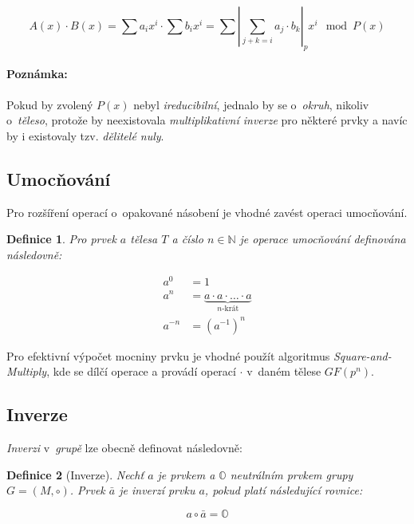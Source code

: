 \documentclass[thesis=M,czech,hidelinks]{FITthesis}[2012/06/26]
\newcommand{\0}{{\textcolor[gray]{0.80}{0}}}
\newtheorem{definice}{Definice}
\begin{document}
$$
    A(x) \cdot B(x) = \sum a_i x^i \cdot \sum b_i x^i =
    \sum \left|\sum_{j+k=i} a_j \cdot b_k\right|_p x^i \mod P(x)
$$


\paragraph{Poznámka:} Pokud by zvolený $P(x)$ nebyl \emph{ireducibilní}, jednalo
by se o~\emph{okruh}, nikoliv o~\emph{těleso}, protože by neexistovala
\emph{multiplikativní inverze} pro některé prvky a navíc by i existovaly tzv.
\emph{dělitelé nuly}.


\subsection{Umocňování}

Pro rozšíření operací o~opakované násobení je vhodné zavést operaci umocňování.

\begin{definice}
    Pro prvek $a$ tělesa $T$ a číslo $n\in\mathbb{N}$ je operace
    umocňování definována následovně:

    \begin{align*}
        a^0     &= 1 \\
        a^n     &= \underbrace{a \cdot a \cdot \ldots \cdot a}_{\text{$n$-krát}} \\
        a^{-n}  &= \left(a^{-1}\right)^n
    \end{align*}
\end{definice}

Pro efektivní výpočet mocniny prvku je vhodné použít algoritmus
\emph{Square-and-Multiply}, kde se dílčí operace  a 
provádí operací $\cdot$ v~daném tělese $GF(p^n)$.

\subsection{Inverze}

\emph{Inverzi} v~\emph{grupě} lze obecně definovat následovně:

\begin{definice}[Inverze]
    Nechť $a$ je prvkem a $\mathbb{O}$ neutrálním prvkem \emph{grupy} \\
    $G = (M,\circ)$. Prvek $\bar{a}$ je \emph{inverzí} prvku $a$, pokud
    platí následující rovnice:

    $$ a \circ \bar{a} = \mathbb{O} $$
\end{definice}
\end{document}
